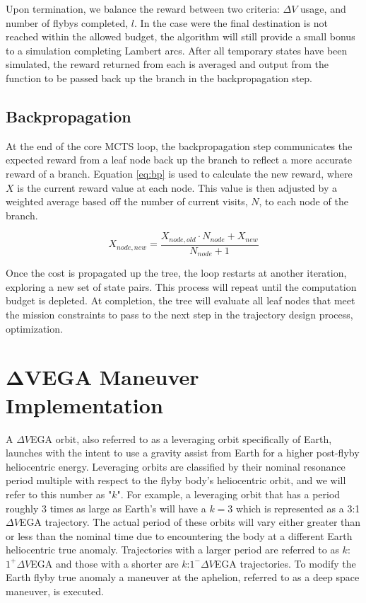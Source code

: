 \documentclass[letterpaper, preprint, paper,11pt]{AAS}	%
\begin{document}
Upon termination, we balance the reward between two criteria: $\Delta V$ usage, and number of flybys completed, $l$. In the case were the final destination is not reached within the allowed budget, the algorithm will still provide a small bonus to a simulation completing Lambert arcs. After all temporary states have been simulated, the reward returned from each is averaged and output from the function to be passed back up the branch in the backpropagation step.

\subsection{Backpropagation}

At the end of the core MCTS loop, the backpropagation step communicates the expected reward from a leaf node back up the branch to reflect a more accurate reward of a branch. Equation \eqref{eq:bp} is used to calculate the new reward, where $X$ is the current reward value at each node. This value is then adjusted by a weighted average based off the number of current visits, $N$, to each node of the branch.

\begin{equation}
    \label{eq:bp}
    X_{node, new} = \frac{X_{node, old} \cdot N_{node} + X_{new}}{N_{node} + 1}
\end{equation}

Once the cost is propagated up the tree, the loop restarts at another iteration, exploring a new set of state pairs. This process will repeat until the computation budget is depleted. At completion, the tree will evaluate all leaf nodes that meet the mission constraints to pass to the next step in the trajectory design process, optimization.

\section*{$\boldsymbol{\Delta V}$EGA Maneuver Implementation}

A $\Delta V$EGA orbit, also referred to as a leveraging orbit specifically of Earth, launches with the intent to use a gravity assist from Earth for a higher post-flyby heliocentric energy\cite{Hollenbeck}. Leveraging orbits are classified by their nominal resonance period multiple with respect to the flyby body's heliocentric orbit, and we will refer to this number as "$k$". For example, a leveraging orbit that has a period roughly 3 times as large as Earth's will have a $k=3$ which is represented as a 3:1 $\Delta V$EGA trajectory. The actual period of these orbits will vary either greater than or less than the nominal time due to encountering the body at a different Earth heliocentric true anomaly. Trajectories with a larger period are referred to as $k$:$1^{+} \Delta V$EGA and those with a shorter are $k$:$1^{-} \Delta V$EGA trajectories. To modify the Earth flyby true anomaly a maneuver at the aphelion, referred to as a deep space maneuver, is executed.
\end{document}
